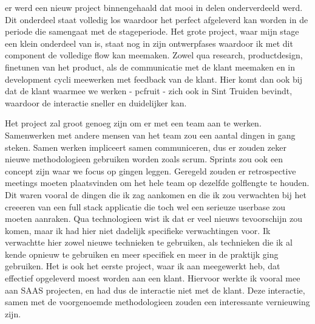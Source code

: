 er werd een nieuw project binnengehaald dat mooi in delen onderverdeeld werd. Dit
onderdeel staat volledig los waardoor het perfect afgeleverd kan worden in de periode die
samengaat met de stageperiode.
Het grote project, waar mijn stage een klein onderdeel van is, staat nog in zijn
ontwerpfases waardoor ik met dit component de volledige flow kan meemaken. Zowel qua
research, productdesign, finetunen van het product, als de communicatie met de klant
meemaken en in development cycli meewerken met feedback van de klant. Hier komt dan ook
bij dat de klant waarmee we werken - pcfruit - zich ook in Sint Truiden bevindt, waardoor
de interactie sneller en duidelijker kan.

Het project zal groot genoeg zijn om er met een team aan te werken. Samenwerken met
andere mensen van het team zou een aantal dingen in gang steken. Samen werken impliceert
samen communiceren, dus er zouden zeker nieuwe methodologieen gebruiken worden zoals
scrum. Sprints zou ook een concept zijn waar we focus op gingen leggen. Geregeld zouden
er retrospective meetings moeten plaatsvinden om het hele team op dezelfde golflengte te
houden. Dit waren vooral de dingen die ik zag aankomen en die ik zou verwachten bij het
creeeren van een full stack applicatie die toch wel een serieuze userbase zou moeten
aanraken.
Qua technologieen wist ik dat er veel nieuws tevoorschijn zou komen, maar ik had hier
niet dadelijk specifieke verwachtingen voor. Ik verwachtte hier zowel nieuwe technieken
te gebruiken, als technieken die ik al kende opnieuw te gebruiken en meer specifiek en
meer in de praktijk ging gebruiken.
Het is ook het eerste project, waar ik aan meegewerkt heb, dat effectief opgeleverd moest
worden aan een klant. Hiervoor werkte ik vooral mee aan SAAS projecten, en had dus de
interactie niet met de klant. Deze interactie, samen met de voorgenoemde methodologieen
zouden een interessante vernieuwing zijn.
